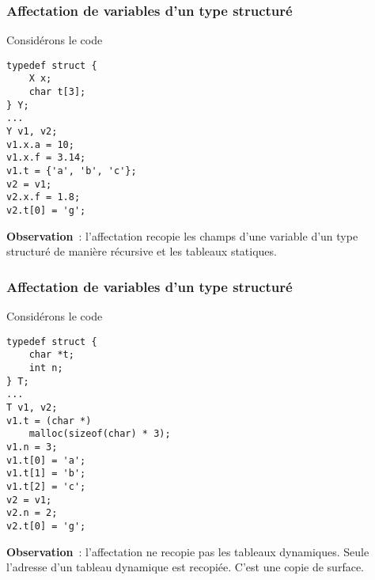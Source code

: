 \begin{frame}[fragile]
\frametitle{Affectation de variables d'un type structuré}
Considérons le code
\begin{multicols}{2}
\begin{lstlisting}
typedef struct {
    X x;
    char t[3];
} Y;
...
Y v1, v2;
v1.x.a = 10;
v1.x.f = 3.14;
v1.t = {'a', 'b', 'c'};
v2 = v1;
v2.x.f = 1.8;
v2.t[0] = 'g';
\end{lstlisting}
\end{multicols}
\medskip

\begin{center}
\end{center}
\medskip

{\bf Observation}~: l'affectation recopie les champs d'une variable d'un
type structuré de manière récursive et les tableaux statiques.
\end{frame}

\begin{frame}[fragile]
\frametitle{Affectation de variables d'un type structuré}
Considérons le code
\begin{multicols}{2}
\begin{lstlisting}
typedef struct {
    char *t;
    int n;
} T;
...
T v1, v2;
v1.t = (char *)
    malloc(sizeof(char) * 3);
v1.n = 3;
v1.t[0] = 'a';
v1.t[1] = 'b';
v1.t[2] = 'c';
v2 = v1;
v2.n = 2;
v2.t[0] = 'g';
\end{lstlisting}
\end{multicols}
\medskip

\begin{center}
\end{center}
\medskip

{\bf Observation}~: l'affectation ne recopie pas les tableaux dynamiques.
Seule l'adresse d'un tableau dynamique est recopiée. C'est une
\alert{copie de surface}.
\end{frame}

